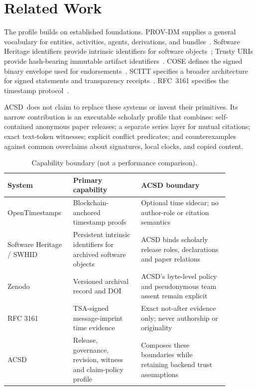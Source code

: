 \documentclass[11pt]{article}
\newcommand{\acsd}{\textsc{ACSD}}
\begin{document}
\section{Related Work}

The profile builds on established foundations. PROV-DM supplies a general vocabulary for entities, activities, agents, derivations, and bundles~\cite{prov}. Software Heritage identifiers provide intrinsic identifiers for software objects~\cite{swhid}; Trusty URIs provide hash-bearing immutable artifact identifiers~\cite{trusty}. COSE defines the signed binary envelope used for endorsements~\cite{cose}. SCITT specifies a broader architecture for signed statements and transparency receipts~\cite{scitt}. RFC~3161 specifies the timestamp protocol~\cite{rfc3161}.

\acsd\ does not claim to replace these systems or invent their primitives. Its narrow contribution is an executable scholarly profile that combines: self-contained anonymous paper releases; a separate series layer for mutual citations; exact text-token witnesses; explicit conflict predicates; and counterexamples against common overclaims about signatures, local clocks, and copied content.

\begin{table}[t]
\centering
\caption{Capability boundary (not a performance comparison).}
\begin{tabular}{p{0.23\linewidth}p{0.29\linewidth}p{0.36\linewidth}}
\toprule
System & Primary capability & ACSD boundary \\
\midrule
OpenTimestamps & Blockchain-anchored timestamp proofs & Optional time sidecar; no author-role or citation semantics \\
Software Heritage / SWHID & Persistent intrinsic identifiers for archived software objects & ACSD binds scholarly release roles, declarations and paper relations \\
Zenodo & Versioned archival record and DOI & ACSD's byte-level policy and pseudonymous team assent remain explicit \\
RFC 3161 & TSA-signed message-imprint time evidence & Exact not-after evidence only; never authorship or originality \\
ACSD & Release, governance, revision, witness and claim-policy profile & Composes these boundaries while retaining backend trust assumptions \\
\bottomrule
\end{tabular}
\end{table}
\end{document}
